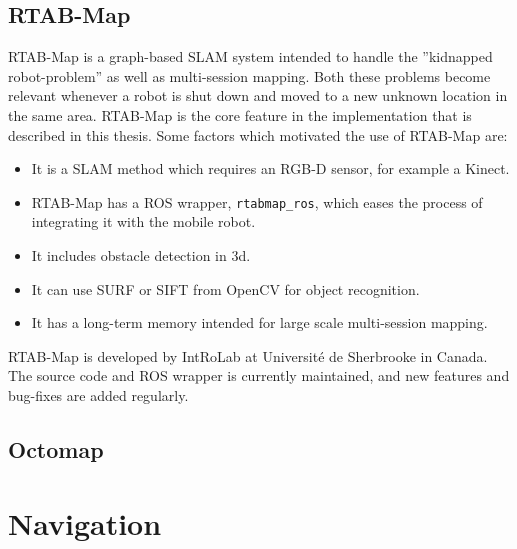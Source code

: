 \subsection{RTAB-Map}

\ac{RTAB-Map} is a graph-based \ac{SLAM} system intended to handle the ''kidnapped robot-problem'' as well as multi-session mapping\cite{RTAB_map}. Both these problems become relevant whenever a robot is shut down and moved to a new unknown location in the same area. \ac{RTAB-Map} is the core feature in the implementation that is described in this thesis. Some factors which motivated the use of \ac{RTAB-Map} are:

\begin{itemize}
	\item It is a \ac{SLAM} method which requires an RGB-D sensor, for example a Kinect.
	\item \ac{RTAB-Map} has a \ac{ROS} wrapper, \texttt{rtabmap\_ros}, which eases the process of integrating it with the mobile robot.
	\item It includes obstacle detection in 3d.
	\item It can use \ac{SURF} or \ac{SIFT} from OpenCV for object recognition.
	\item It has a long-term memory intended for large scale multi-session mapping.
\end{itemize}

\ac{RTAB-Map} is developed by IntRoLab at Université de Sherbrooke in Canada. The source code and \ac{ROS} wrapper is currently maintained, and new features and bug-fixes are added regularly. 

\subsection{Octomap}

\section{Navigation}
